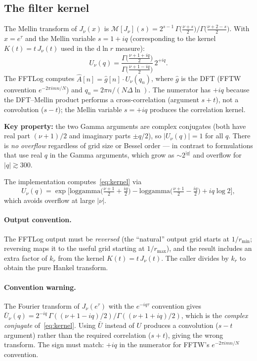 \documentclass[11pt,a4paper]{article}
\begin{document}
\subsection{The filter kernel}

The Mellin transform of $J_\nu(x)$ is
$\mathcal{M}[J_\nu](s) = 2^{s-1}\,\Gamma\!\bigl(\tfrac{\nu+s}{2}\bigr)
\big/\Gamma\!\bigl(\tfrac{\nu+2-s}{2}\bigr)$.
With $x = e^\tau$ and the Mellin variable $s = 1 + iq$ (corresponding to the
kernel $K(t) = t\,J_\nu(t)$ used in the d$\ln r$ measure):
\begin{equation}\label{eq:kernel}
\boxed{
  U_\nu(q)
  = \frac{\Gamma\!\bigl(\frac{\nu+1+iq}{2}\bigr)}
         {\Gamma\!\bigl(\frac{\nu+1-iq}{2}\bigr)}\,2^{+iq}.
}
\end{equation}
The FFTLog computes $\hat A[n] = \hat g[n] \cdot U_\nu(q_n)$, where $\hat g$
is the DFT (FFTW convention $e^{-2\pi i mn/N}$) and $q_n = 2\pi n/(N\Delta\!\ln)$.
The numerator has $+iq$ because the DFT--Mellin product performs a cross-correlation
(argument $s+t$), not a convolution ($s-t$); the Mellin variable $s = +iq$ produces
the correlation kernel.

\textbf{Key property:} the two Gamma arguments are complex conjugates
(both have real part $(\nu+1)/2$ and imaginary parts $\pm q/2$), so
$|U_\nu(q)| = 1$ for all $q$.  There is \emph{no overflow} regardless
of grid size or Bessel order --- in contrast to formulations that use real $q$
in the Gamma arguments, which grow as $\sim 2^{|q|}$ and overflow for
$|q| \gtrsim 300$.

The implementation computes~\eqref{eq:kernel} via
\begin{equation}
  U_\nu(q) = \exp\bigl[
    \mathrm{loggamma}\!\bigl(\tfrac{\nu+1}{2} + \tfrac{iq}{2}\bigr)
    - \mathrm{loggamma}\!\bigl(\tfrac{\nu+1}{2} - \tfrac{iq}{2}\bigr)
    + iq\log 2
  \bigr],
\end{equation}
which avoids overflow at large $|\nu|$.

\paragraph{Output convention.}
The FFTLog output must be \emph{reversed} (the ``natural'' output grid starts
at $1/r_{\min}$; reversing maps it to the useful grid starting at $1/r_{\max}$),
and the result includes an extra factor of $k_r$ from the kernel
$K(t) = t\,J_\nu(t)$.  The caller divides by $k_r$ to obtain the pure Hankel
transform.

\paragraph{Convention warning.}
The Fourier transform of $J_\nu(e^\tau)$ with the $e^{-iq\tau}$ convention gives
$\bar U_\nu(q) = 2^{-iq}\,\Gamma((\nu+1-iq)/2)/\Gamma((\nu+1+iq)/2)$, which is
the \emph{complex conjugate} of~\eqref{eq:kernel}.  Using $\bar U$ instead of $U$
produces a convolution ($s-t$ argument) rather than the required correlation ($s+t$),
giving the wrong transform.  The sign must match: $+iq$ in the numerator for
FFTW's $e^{-2\pi imn/N}$ convention.
\end{document}
